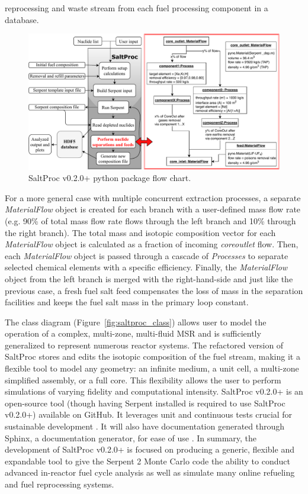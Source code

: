 \documentclass[12pt]{article} %
\begin{document}
reprocessing and waste stream from each fuel processing component in a 
database. 
\begin{figure}[ht!] %
	\centering
  \includegraphics[width=1.03\textwidth]{saltproc_flowchart.pdf}
  	  	\vspace{-0.35in}
  \caption{SaltProc v0.2.0+ python package flow chart.}
  \label{fig:saltproc_flow}
\end{figure}

For a more general case with multiple concurrent extraction processes, a 
separate \textit{MaterialFlow} object is created for each branch with a 
user-defined mass flow rate (e.g. 90\% of total mass flow rate flows through 
the left branch and 10\% through the right branch). The total mass and  
isotopic composition vector for each \textit{MaterialFlow} object is 
calculated as a fraction of incoming \textit{core\textunderscore outlet} flow. 
Then, each \textit{MaterialFlow} object is passed through a cascade of 
\textit{Processes} to separate selected chemical elements with a specific 
efficiency. Finally, the \textit{MaterialFlow} object from the left branch is  
merged with the right-hand-side and just like the previous case, a fresh 
fuel salt feed compensates the loss of mass in the separation facilities and 
keeps the fuel salt mass in the primary loop constant.

The class diagram (Figure~\ref{fig:saltproc_class}) allows user to model the 
operation of a complex, multi-zone, multi-fluid \gls{MSR} and is sufficiently 
generalized to represent numerous reactor systems. The refactored version of 
SaltProc stores and edits the isotopic composition of the fuel stream, making  
it a flexible tool to model any geometry: an infinite medium, a unit cell, a 
multi-zone simplified assembly, or a full core. This flexibility allows the 
user to perform simulations of varying fidelity and computational 
intensity. SaltProc v0.2.0+ is an open-source tool (though having Serpent 
installed is required to use SaltProc v0.2.0+) available on GitHub. It leverages 
unit and continuous tests crucial for sustainable development 
\cite{krekel_pytest_2004}. It will also have documentation generated through 
Sphinx, a documentation generator, for ease of use \cite{brandl_sphinx_2009}. 
In summary, the development of SaltProc v0.2.0+ is focused on producing a 
generic, flexible and expandable tool to give the Serpent 2 Monte Carlo code 
the ability to conduct advanced in-reactor fuel cycle analysis as well as 
simulate many online refueling and fuel reprocessing systems.
\end{document}

